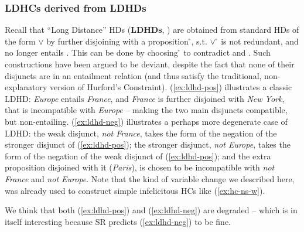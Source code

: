 \subsubsection{LDHCs derived from LDHDs}

Recall that ``Long Distance'' HDs (\textbf{LDHDs}, ) are obtained from standard HDs of the form \p{} $\vee$ \pplus{} by further disjoining \pplus{} with a proposition \r{}, s.t. \pplus{} $\vee$ \r{} is not redundant, and no longer entails \p. This can be done by choosing \r{} to contradict \pplus{} and \p{}. Such constructions have been argued to be deviant, despite the fact that none of their disjuncts are in an entailment relation (and thus satisfy the traditional, non-explanatory version of Hurford's Constraint). (\ref{ex:ldhd-pos}) illustrates a classic LDHD: \textit{Europe} entails \textit{France}, and \textit{France} is further disjoined with \textit{New York}, that is incompatible with \textit{Europe} -- making the two main disjuncts compatible, but non-entailing.  (\ref{ex:ldhd-neg}) illustrates a perhaps more degenerate case of LDHD: the weak disjunct, \textit{not France}, takes the form of the negation of the stronger disjunct of (\ref{ex:ldhd-pos}); the stronger disjunct, \textit{not Europe}, takes the form of the negation of the weak disjunct of (\ref{ex:ldhd-pos}); and the extra proposition disjoined with it (\textit{Paris}), is chosen to be incompatible with \textit{not France} and \textit{not Europe}. Note that the kind of variable change we described here, was already used to construct simple infelicitous HCs like (\ref{ex:hc-ns-w}).

\begin{exe}
	\begin{xlist}
		\label{ex:ldhd-pos}
		\label{ex:ldhd-neg}
	\end{xlist}
\end{exe}

We think that both (\ref{ex:ldhd-pos}) and (\ref{ex:ldhd-neg}) are degraded -- which is in itself interesting because SR predicts (\ref{ex:ldhd-neg}) to be fine.

